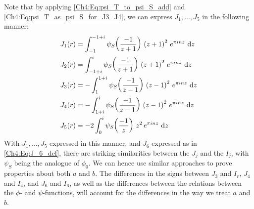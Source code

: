 Note that by applying \eqref{Ch4:Eq:psi_T_to_psi_S_add} and \eqref{Ch4:Eq:psi_T_as_psi_S_for_J3_J4}, we can express $J_1, \ldots, J_5$ in the following manner:
\begin{align}
    J_1(r) &= \int_{-1}^{-1 + i} \psi_S\of{\frac{-1}{z + 1}} \, \parenth{z + 1}^2 \, e^{\pi i n z} \, \diff{z} \label{Ch4:Eq:J1_like_I1} \\
    J_2(r) &= \int_{-1 + i}^{i} \psi_S\of{\frac{-1}{z + 1}} \, \parenth{z + 1}^2 \, e^{\pi i n z} \, \diff{z} \label{Ch4:Eq:J2_like_I2} \\
    J_3(r) &= -\int_{1}^{1 + i} \psi_S\of{\frac{-1}{z - 1}} \, \parenth{z - 1}^2 \, e^{\pi i n z} \, \diff{z} \label{Ch4:Eq:J3_like_I3} \\
    J_4(r) &= -\int_{1 + i}^{i} \psi_S\of{\frac{-1}{z - 1}} \, \parenth{z - 1}^2 \, e^{\pi i n z} \, \diff{z} \label{Ch4:Eq:J4_like_I4} \\
    J_5(r) &= -2 \int_{0}^{i} \psi_S\of{\frac{-1}{z}} \, z^2 \, e^{\pi i n z} \, \diff{z} \label{Ch4:Eq:J5_like_I5}
\end{align}
With $J_1, \ldots, J_5$ expressed in this manner, and $J_6$ expressed as in \eqref{Ch4:Eq:J_6_def}, there are striking similarities between the $J_j$ and the $I_j$, with $\psi_S$ being the analogue of $\phi_0$. We can hence use similar approaches to prove properties about both $a$ and $b$. The differences in the signs between $J_3$ and $I_r$, $J_4$ and $I_4$, and $J_6$ and $I_6$, as well as the differences between the relations between the $\phi$- and $\psi$-functions, will account for the differences in the way we treat $a$ and $b$.